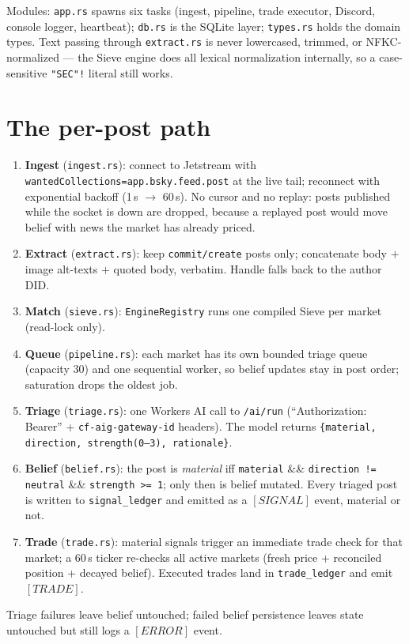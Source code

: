 \documentclass[10pt,a4paper]{article}
\begin{document}
Modules: \texttt{app.rs} spawns six tasks (ingest, pipeline, trade executor,
Discord, console logger, heartbeat); \texttt{db.rs} is the SQLite layer;
\texttt{types.rs} holds the domain types. Text passing through
\texttt{extract.rs} is never lowercased, trimmed, or NFKC-normalized --- the
Sieve engine does all lexical normalization internally, so a case-sensitive
\texttt{"SEC"!} literal still works.

\section{The per-post path}\label{sec:path}

\begin{enumerate}[leftmargin=1.5em, itemsep=1pt, topsep=2pt]
  \item \textbf{Ingest} (\texttt{ingest.rs}): connect to Jetstream with
    \texttt{wantedCollections=app.bsky.feed.post} at the live tail; reconnect
    with exponential backoff (1\,s $\to$ 60\,s). No cursor and no replay:
    posts published while the socket is down are dropped, because a replayed
    post would move belief with news the market has already priced.
  \item \textbf{Extract} (\texttt{extract.rs}): keep \texttt{commit/create}
    posts only; concatenate body $+$ image alt-texts $+$ quoted body, verbatim.
    Handle falls back to the author DID.
  \item \textbf{Match} (\texttt{sieve.rs}): \texttt{EngineRegistry} runs one
    compiled Sieve per market (read-lock only).
  \item \textbf{Queue} (\texttt{pipeline.rs}): each market has its own bounded
    triage queue (capacity 30) and one sequential worker, so belief updates
    stay in post order; saturation drops the oldest job.
  \item \textbf{Triage} (\texttt{triage.rs}): one Workers AI call to
    \texttt{/ai/run} (``Authorization: Bearer'' + \texttt{cf-aig-gateway-id}
    headers). The model returns
    \texttt{\{material, direction, strength(0--3), rationale\}}.
  \item \textbf{Belief} (\texttt{belief.rs}): the post is
    \emph{material} iff \texttt{material} \&\& \texttt{direction != neutral}
    \&\& \texttt{strength >= 1}; only then is belief mutated. Every triaged
    post is written to \texttt{signal\_ledger} and emitted as a $[SIGNAL]$
    event, material or not.
  \item \textbf{Trade} (\texttt{trade.rs}): material signals trigger an
    immediate trade check for that market; a 60\,s ticker re-checks all active
    markets (fresh price + reconciled position + decayed belief). Executed
    trades land in \texttt{trade\_ledger} and emit $[TRADE]$.
\end{enumerate}
Triage failures leave belief untouched; failed belief persistence leaves state
untouched but still logs a $[ERROR]$ event.
\end{document}
